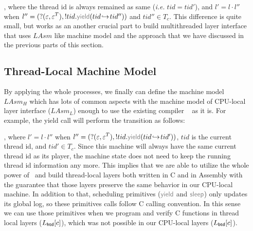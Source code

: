 , where the thread id is always remained as same (\textit{i.e.} $tid = tid'$),
and $l' = l \cdot l''$ when $l'' = (?(\oracle, \oracle^{T}), !tid.\commc{yield}(tid \switch tid''))$
 and $tid'' \in T_c$.
This difference is quite small, but works as an another crucial part to build  multithreaded layer interface 
that uses $LAsm$ like machine model and the approach that we have discussed in the previous parts of this section. 

\subsection{Thread-Local Machine Model}\label{subsec:hasm}
By applying the whole processes,
we finally can define the machine model $LAsm_H$ 
which has lots of common aspects with the machine model of CPU-local layer interface ($LAsm_L$)
enough to use the existing compiler \compcertx~\cite{dscal15} as it is.
For example, the yield call will perform the transition as follows:
\begin{center}
\end{center}
, where  $l' = l \cdot l''$ when $l'' = (?(\oracle, \oracle^{T}), !tid.\commc{yield}(tid \switch tid'))$,
$tid$ is the current thread id, and $tid' \in T_c$.
Since this machine will always have the same current thread id as its player, the machine state 
does not need to keep the running thread id information any more. 
This implies that we are able to 
utilize the whole power of \compcertx\ and build thread-local layers both written in 
C and in Assembly with the guarantee that those layers preserve the same behavior in our CPU-local machine.
In addition to that, scheduling primitives ($\commc{yield}$ and $\commc{sleep}$) only updates its global log, so these primitives calls
follow C calling convention. 
In this sense we can use those primitives when we program and verify C functions in thread local layers ($L_{\mathsf{\textcolor{black}{htd}}}[c]$), which was 
not possible in our CPU-local layers ($L_{\mathsf{\textcolor{black}{btd}}}[c]$).
 

